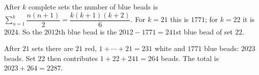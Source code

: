 After $k$ complete sets the number of blue beads is $\sum_{n=1}^k\dfrac{n(n+1)}2=\dfrac{k(k+1)(k+2)}{6}$. For $k=21$ this is $1771$; for $k=22$ it is $2024$. So the $2012$th blue bead is the $2012-1771=241$st blue bead of set $22$.

After $21$ sets there are $21$ red, $1+\cdots+21=231$ white and $1771$ blue beads: $2023$ beads. Set $22$ then contributes $1+22+241=264$ beads. The total is $2023+264=\boxed{2287}$.
